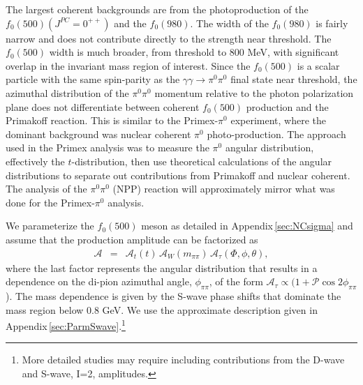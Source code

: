  The largest coherent backgrounds are  
from the photoproduction of the $f_0(500)(J^{PC}=0^{++})$ and the $f_0(980)$.  The width of the
$f_0(980)$ is fairly narrow and does not contribute directly to the strength near threshold.
The $f_0(500)$ width is much
broader, from threshold to 800 MeV, with significant overlap in the
invariant mass region of interest.  Since the $f_0(500)$ is a scalar
particle with the same spin-parity as the $\gamma \gamma \rightarrow
\pi^0\pi^0$ final state near threshold, the azimuthal distribution of the $\pi^0\pi^0$ momentum relative to the
photon polarization plane does not differentiate between coherent
$f_0(500)$ production and the Primakoff reaction.  
This is similar to the Primex-$\pi^0$ experiment, where the dominant background was
nuclear coherent $\pi^0$ photo-production.  The approach used in the
Primex analysis was to measure the $\pi^0$ angular distribution,
effectively the $t$-distribution, then use theoretical calculations of
the angular distributions to separate out contributions from Primakoff
and nuclear coherent. The analysis of the $\pi^0\pi^0$ (NPP) reaction
will approximately mirror what was done for the Primex-$\pi^0$
analysis.  

We parameterize the $f_{0}(500)$ meson as detailed in Appendix\,\ref{sec:NCsigma} and assume that the production amplitude can be factorized as
\begin{eqnarray}
\mathcal{A} & = & \mathcal{A}_t(t) \, \mathcal{A}_W(m_{\pi\pi}) \, \mathcal{A}_\tau(\Phi, \phi, \theta),
\end{eqnarray}
where the last factor represents the angular distribution that results in a 
dependence on the di-pion azimuthal angle, $\phi_{\pi\pi}$, of the form $\mathcal{A}_\tau \propto (1 + \mathcal{P} \cos{2\phi_{\pi\pi}}$). 
The mass dependence is given by the S-wave phase shifts that dominate the mass region below 0.8 GeV. We use the approximate description given in 
Appendix\,\ref{sec:ParmSwave}.\footnote{More detailed studies may require including contributions from the D-wave and S-wave, I=2, amplitudes.} 

